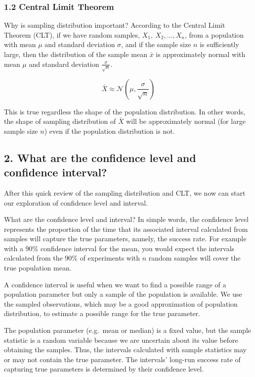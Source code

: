 \documentclass[
]{article}
\begin{document}
\hypertarget{central-limit-theorem}{%
\subsubsection{1.2 Central Limit Theorem}\label{central-limit-theorem}}

Why is sampling distribution important? According to the Central Limit
Theorem (CLT), if we have random samples, \(X_1, \ X_2, \dots, X_n\),
from a population with mean \(\mu\) and standard deviation \(\sigma\),
and if the sample size \(n\) is sufficiently large, then the
distribution of the sample mean \(\bar{x}\) is approximately normal with
mean \(\mu\) and standard deviation \(\frac{\sigma}{\sqrt{n}}\).

\[\bar{X} \approx \mathcal{N}\left(\mu, \frac{\sigma}{\sqrt{n}}\right)\]

This is true regardless the shape of the population distribution. In
other words, the shape of sampling distribution of \(\bar{X}\) will be
approximately normal (for large sample size \(n\)) even if the
population distribution is not.

\hypertarget{what-are-the-confidence-level-and-confidence-interval}{%
\subsection{2. What are the confidence level and confidence
interval?}\label{what-are-the-confidence-level-and-confidence-interval}}

After this quick review of the sampling distribution and CLT, we now can
start our exploration of confidence level and interval.

What are the confidence level and interval? In simple words, the
confidence level represents the proportion of the time that its
associated interval calculated from samples will capture the true
parameters, namely, the success rate. For example with a 90\% confidence
interval for the mean, you would expect the intervals calculated from
the 90\% of experiments with \(n\) random samples will cover the true
population mean.

A confidence interval is useful when we want to find a possible range of
a population parameter but only a sample of the population is available.
We use the sampled observations, which may be a good approximation of
population distribution, to estimate a possible range for the true
parameter.

The population parameter (e.g.~mean or median) is a fixed value, but the
sample statistic is a random variable because we are uncertain about its
value before obtaining the samples. Thus, the intervals calculated with
sample statistics may or may not contain the true parameter. The
intervals' long-run success rate of capturing true parameters is
determined by their confidence level.
\end{document}
